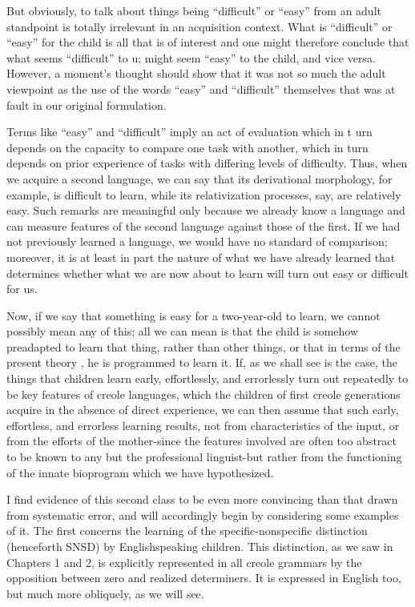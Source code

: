 But obviously, to talk about things being ``difficult'' or ``easy'' from an adult standpoint is totally irrelevant in an acquisition context. What is ``difficult'' or ``easy'' for the child is all that is of interest and one might therefore conclude that what seems ``difficult'' to u; might seem ``easy'' to the child, and vice versa. However, a moment's
thought should show that it was not so much the adult viewpoint as the use of the words ``easy'' and ``difficult'' themselves that was at fault in our original formulation.

Terms like ``easy'' and ``difficult'' imply an act of evaluation
which in t urn depends on the capacity to compare one task with another, which in turn depends on prior experience of tasks with differing levels of difficulty. Thus, when we acquire a second language, we can say that its derivational morphology, for example, is difficult to learn, while its relativization processes, say, are relatively easy. Such remarks are meaningful only because we already know a language and can measure features of the second language against those of the first. If we had not previously learned a language, we would have no standard of comparison; moreover, it is at least in part the nature of what we have already learned that determines whether what we are now about to learn will turn out easy or difficult for us.

Now, if we say that something is easy for a two-year-old to
learn, we cannot possibly mean any of this; all we can mean is that the child is somehow preadapted to learn that thing, rather than other things, or that in terms of the present theory , he is programmed to learn it. If, as we shall see is the case, the things that children learn early, effortlessly, and errorlessly turn out repeatedly to be key features of creole languages, which the children of first creole generations acquire in the absence of direct experience, we can then assume that such early, effortless, and errorless learning results, not from charac\-teristics of the input, or from the efforts of the mother-since the features involved are often too abstract to be known to any but the professional linguist-but rather from the functioning of the innate bioprogram which we have hypothesized.

I find evidence of this second class to be even more convincing
than that drawn from systematic error, and will accordingly begin by considering some examples of it. The first concerns the learning of the specific-nonspecific distinction (henceforth SNSD) by English\-speaking children. This distinction, as we saw in Chapters 1 and 2, is explicitly represented in all creole grammars by the opposition
% 
between zero and realized determiners. It is expressed in English too, but much more obliquely, as we will see.

